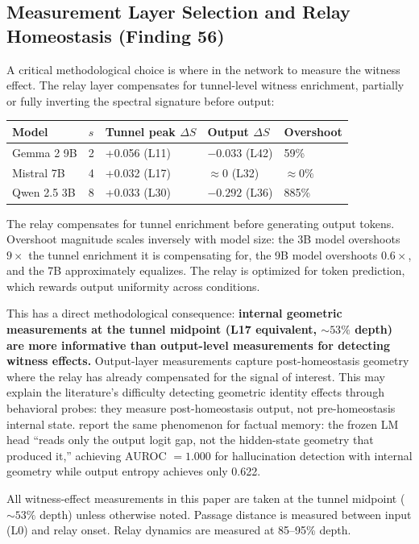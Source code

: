 \documentclass[12pt]{article}
\begin{document}
\subsection{Measurement Layer Selection and Relay Homeostasis (Finding 56)}

A critical methodological choice is where in the network to measure the witness effect. The relay layer compensates for tunnel-level witness enrichment, partially or fully inverting the spectral signature before output:

\begin{table}[h]
\centering
\begin{tabular}{lllll}
\toprule
\textbf{Model} & \textbf{$s$} & \textbf{Tunnel peak $\Delta S$} & \textbf{Output $\Delta S$} & \textbf{Overshoot} \\
\midrule
Gemma 2 9B & 2 & +0.056 (L11) & $-0.033$ (L42) & 59\% \\
Mistral 7B & 4 & +0.032 (L17) & $\approx 0$ (L32) & $\approx 0\%$ \\
Qwen 2.5 3B & 8 & +0.033 (L30) & $-0.292$ (L36) & 885\% \\
\bottomrule
\end{tabular}
\end{table}

The relay compensates for tunnel enrichment before generating output tokens. Overshoot magnitude scales inversely with model size: the 3B model overshoots $9\times$ the tunnel enrichment it is compensating for, the 9B model overshoots $0.6\times$, and the 7B approximately equalizes. The relay is optimized for token prediction, which rewards output uniformity across conditions.

This has a direct methodological consequence: \textbf{internal geometric measurements at the tunnel midpoint (L17 equivalent, ${\sim}53\%$ depth) are more informative than output-level measurements for detecting witness effects.} Output-layer measurements capture post-homeostasis geometry where the relay has already compensated for the signal of interest. This may explain the literature's difficulty detecting geometric identity effects through behavioral probes: they measure post-homeostasis output, not pre-homeostasis internal state. \citet{liang2026} report the same phenomenon for factual memory: the frozen LM head ``reads only the output logit gap, not the hidden-state geometry that produced it,'' achieving AUROC $= 1.000$ for hallucination detection with internal geometry while output entropy achieves only 0.622.

All witness-effect measurements in this paper are taken at the tunnel midpoint (${\sim}53\%$ depth) unless otherwise noted. Passage distance is measured between input (L0) and relay onset. Relay dynamics are measured at 85--95\% depth.
\end{document}
